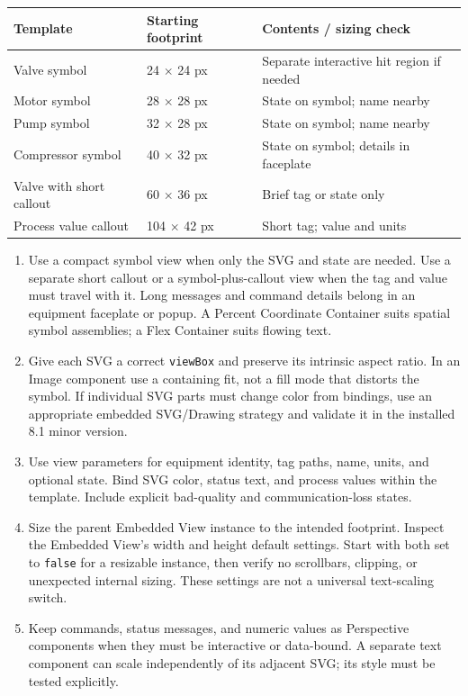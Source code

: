 \begin{center}
\begin{tabular}{@{}p{4.2cm}p{3.1cm}p{5.7cm}@{}}
\toprule
Template & Starting footprint & Contents / sizing check\\ \midrule
Valve symbol & 24 $\times$ 24 px & Separate interactive hit region if needed\\
Motor symbol & 28 $\times$ 28 px & State on symbol; name nearby\\
Pump symbol & 32 $\times$ 28 px & State on symbol; name nearby\\
Compressor symbol & 40 $\times$ 32 px & State on symbol; details in faceplate\\
Valve with short callout & 60 $\times$ 36 px & Brief tag or state only\\
Process value callout & 104 $\times$ 42 px & Short tag; value and units\\
\bottomrule
\end{tabular}
\end{center}

\begin{enumerate}[leftmargin=*,itemsep=3pt]
\item Use a compact symbol view when only the SVG and state are needed. Use a separate short callout or a symbol-plus-callout view when the tag and value must travel with it. Long messages and command details belong in an equipment faceplate or popup. A Percent Coordinate Container suits spatial symbol assemblies; a Flex Container suits flowing text.
\item Give each SVG a correct \texttt{viewBox} and preserve its intrinsic aspect ratio. In an Image component use a containing fit, not a fill mode that distorts the symbol. If individual SVG parts must change color from bindings, use an appropriate embedded SVG/Drawing strategy and validate it in the installed 8.1 minor version.
\item Use view parameters for equipment identity, tag paths, name, units, and optional state. Bind SVG color, status text, and process values within the template. Include explicit bad-quality and communication-loss states.
\item Size the parent Embedded View instance to the intended footprint. Inspect the Embedded View's width and height default settings. Start with both set to \texttt{false} for a resizable instance, then verify no scrollbars, clipping, or unexpected internal sizing. These settings are not a universal text-scaling switch.
\item Keep commands, status messages, and numeric values as Perspective components when they must be interactive or data-bound. A separate text component can scale independently of its adjacent SVG; its style must be tested explicitly.
\end{enumerate}

